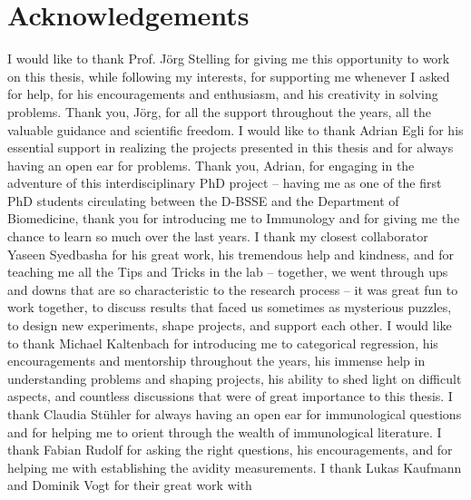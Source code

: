 
\bigskip

\begingroup
\let\clearpage\relax
\let\cleardoublepage\relax
\let\cleardoublepage\relax
\chapter*{Acknowledgements}

\def\thanks#1{%
\begingroup
\leftskip1em
\noindent #1
\par
\endgroup
}

I would like to thank Prof. J\"org Stelling for giving me this opportunity to work on this thesis, while following my interests, for supporting me whenever I asked for help, for his encouragements
and enthusiasm, and his creativity in solving problems. Thank you, Jörg, for all the support
throughout the years, all the valuable guidance and scientific freedom.
I would like to thank Adrian Egli for his essential support in realizing the projects presented in
this thesis and for always having an open ear for problems. Thank you, Adrian, for engaging
in the adventure of this interdisciplinary PhD project – having me as one of the first PhD
students circulating between the D-BSSE and the Department of Biomedicine, thank you for
introducing me to Immunology and for giving me the chance to learn so much over the last
years.
I thank my closest collaborator Yaseen Syedbasha for his great work, his tremendous help and
kindness, and for teaching me all the Tips and Tricks in the lab – together, we went through ups
and downs that are so characteristic to the research process – it was great fun to work together,
to discuss results that faced us sometimes as mysterious puzzles, to design new experiments,
shape projects, and support each other.
I would like to thank Michael Kaltenbach for introducing me to categorical regression, his
encouragements and mentorship throughout the years, his immense help in understanding
problems and shaping projects, his ability to shed light on difficult aspects, and countless
discussions that were of great importance to this thesis.
I thank Claudia Stühler for always having an open ear for immunological questions and for
helping me to orient through the wealth of immunological literature. I thank Fabian Rudolf
for asking the right questions, his encouragements, and for helping me with establishing the
avidity measurements. I thank Lukas Kaufmann and Dominik Vogt for their great work with
